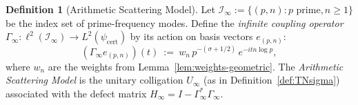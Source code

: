 \documentclass[11pt]{article}
\theoremstyle{definition}
\newtheorem{definition}[theorem]{Definition}
\theoremstyle{remark}
\theoremstyle{definition}
\begin{document}
\begin{definition}[Arithmetic Scattering Model]\label{def:scattering-model}
Let $\mathcal I_\infty := \{(p,n) : p \text{ prime}, n \ge 1\}$ be the index set of prime-frequency modes.
Define the \emph{infinite coupling operator} $\Gamma_\infty : \ell^2(\mathcal I_\infty) \to L^2(\psi_{\mathrm{cert}})$ by its action on basis vectors $e_{(p,n)}$:
\begin{equation}\label{eq:gamma-inf-def}
  (\Gamma_\infty e_{(p,n)})(t) \ := \ w_n \, p^{-(\sigma + 1/2)} \, e^{-it n \log p},
\end{equation}
where $w_n$ are the weights from Lemma~\ref{lem:weights-geometric}. The \emph{Arithmetic Scattering Model} is the unitary colligation $U_\infty$ (as in Definition~\ref{def:TNsigma}) associated with the defect matrix $H_\infty = I - \Gamma_\infty^*\Gamma_\infty$.
\end{definition}
\end{document}
